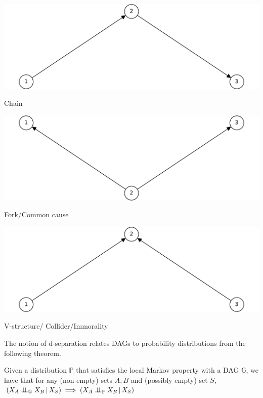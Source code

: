 \documentclass{tufte-book}
\begin{document}
 \begin{marginfigure} \includegraphics[width=\linewidth]{ ./figures/chainl.pdf}\caption{ Chain} \end{marginfigure} 

 \begin{marginfigure} \includegraphics[width=\linewidth]{ ./figures/fork.pdf}\caption{ Fork/Common cause} \end{marginfigure} 
 \begin{marginfigure} \includegraphics[width=\linewidth]{ ./figures/collider.pdf}\caption{ V-structure/ Collider/Immorality} \end{marginfigure} 


The notion of d-separation relates DAGs to probability distributions from the following theorem.
\begin{definition}\label{thm:dagci}

Given a distribution $\mathbb{P}$ that satisfies the local Markov property with a DAG $\mathbb{G}$, we have that for any (non-empty) sets $A,B$ and (possibly empty) set $S$, $(X_A \perp \!\!\! \perp_{\mathbb{G}} X_B \,|\,X_S) \implies (X_A \perp \!\!\! \perp_{\mathbb{P}} X_B \,|\, X_S)$


\end{definition}
\end{document}
